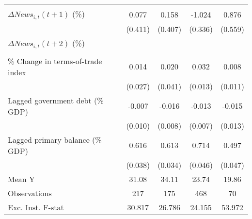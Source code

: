 {\begin{tabular}{l*{4}{c}}
                    &                     &                     &                     &                     \\
\addlinespace
$ \Delta News_{i,t}(t+1)$ (\%)&       0.077         &       0.158         &      -1.024\sym{***}&       0.876         \\
                    &     (0.411)         &     (0.407)         &     (0.336)         &     (0.559)         \\
\addlinespace
$ \Delta News_{i,t}(t+2)$ (\%)&                     &                     &                     &                     \\
                    &                     &                     &                     &                     \\
\addlinespace
\% Change in terms-of-trade index&       0.014         &       0.020         &       0.032\sym{**} &       0.008         \\
                    &     (0.027)         &     (0.041)         &     (0.013)         &     (0.011)         \\
\addlinespace
Lagged government debt (\% GDP)&      -0.007         &      -0.016\sym{**} &      -0.013\sym{*}  &      -0.015         \\
                    &     (0.010)         &     (0.008)         &     (0.007)         &     (0.013)         \\
\addlinespace
Lagged primary balance (\% GDP)&       0.616\sym{***}&       0.613\sym{***}&       0.714\sym{***}&       0.497\sym{***}\\
                    &     (0.038)         &     (0.034)         &     (0.046)         &     (0.047)         \\
\midrule
Mean Y              &       31.08         &       34.11         &       23.74         &       19.86         \\
Observations        &         217         &         175         &         468         &          70         \\
Exc. Inst. F-stat   &      30.817         &      26.786         &      24.155         &      53.972         \\
\bottomrule
\end{tabular}
}
